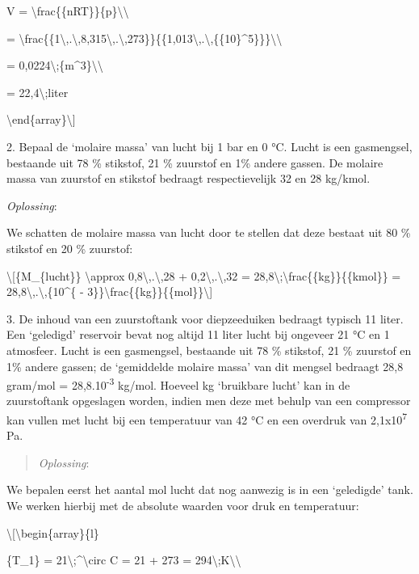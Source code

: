 \documentclass[]{article}
\begin{document}
V = \textbackslash{}frac\{\{nRT\}\}\{p\}\textbackslash{}\textbackslash{}

=
\textbackslash{}frac\{\{1\textbackslash{},.\textbackslash{},8,315\textbackslash{},.\textbackslash{},273\}\}\{\{1,013\textbackslash{},.\textbackslash{},\{\{10\}\^{}5\}\}\}\textbackslash{}\textbackslash{}

= 0,0224\textbackslash{};\{m\^{}3\}\textbackslash{}\textbackslash{}

= 22,4\textbackslash{};liter

\textbackslash{}end\{array\}\textbackslash{}{]}

2. Bepaal de `molaire massa' van lucht bij 1 bar en 0 °C. Lucht is een
gasmengsel, bestaande uit 78 \% stikstof, 21 \% zuurstof en 1\% andere
gassen. De molaire massa van zuurstof en stikstof bedraagt
respectievelijk 32 en 28 kg/kmol.

\emph{Oplossing}:

We schatten de molaire massa van lucht door te stellen dat deze bestaat
uit 80 \% stikstof en 20 \% zuurstof:

\textbackslash{}{[}\{M\_\{lucht\}\} \textbackslash{}approx
0,8\textbackslash{},.\textbackslash{},28 +
0,2\textbackslash{},.\textbackslash{},32 =
28,8\textbackslash{};\textbackslash{}frac\{\{kg\}\}\{\{kmol\}\} =
28,8\textbackslash{},.\textbackslash{},\{10\^{}\{ -
3\}\}\textbackslash{}frac\{\{kg\}\}\{\{mol\}\}\textbackslash{}{]}

3. De inhoud van een zuurstoftank voor diepzeeduiken bedraagt typisch 11
liter. Een `geledigd' reservoir bevat nog altijd 11 liter lucht bij
ongeveer 21 °C en 1 atmosfeer. Lucht is een gasmengsel, bestaande uit 78
\% stikstof, 21 \% zuurstof en 1\% andere gassen; de `gemiddelde molaire
massa' van dit mengsel bedraagt 28,8 gram/mol =
28,8.10\textsuperscript{-3} kg/mol. Hoeveel kg `bruikbare lucht' kan in
de zuurstoftank opgeslagen worden, indien men deze met behulp van een
compressor kan vullen met lucht bij een temperatuur van 42 °C en een
overdruk van 2,1x10\textsuperscript{7} Pa.

\begin{quote}
\emph{Oplossing}:
\end{quote}

We bepalen eerst het aantal mol lucht dat nog aanwezig is in een
`geledigde' tank. We werken hierbij met de absolute waarden voor druk en
temperatuur:

\textbackslash{}{[}\textbackslash{}begin\{array\}\{l\}

\{T\_1\} = 21\textbackslash{};\^{}\textbackslash{}circ C = 21 + 273 =
294\textbackslash{};K\textbackslash{}\textbackslash{}
\end{document}
